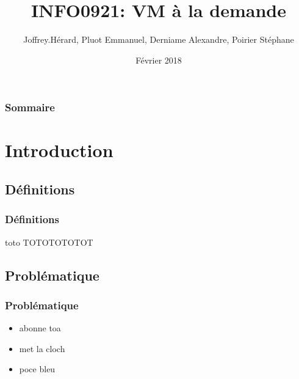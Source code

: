 \documentclass{beamer}
\title[Machines virtuelles à la demande]{INFO0921: VM à la demande } %
\author{Joffrey.Hérard, Pluot Emmanuel, Derniame Alexandre, Poirier Stéphane} %
\institute[URCA] %
{
Université de Reims \\ %
\medskip
\textit{joffrey.herard@etudiant.univ-reims.fr\\
		emmanuel.pluot@etudiant.univ-reims.fr\\
		alexandre.derniame@etudiant.univ-reims.fr\\
		stephane.poirier@etudiant.univ-reims.fr} 
}
\date{Février 2018} %
\begin{document}
\begin{frame}
\titlepage %
\end{frame}

\begin{frame}
\frametitle{Sommaire} %
\tableofcontents %
\end{frame}


\section{Introduction} 

\subsection{Définitions} 
\begin{frame}
\frametitle{Définitions}
\begin{block}{toto}
TOTOTOTOTOT
\end{block}
\end{frame}

\subsection{Problématique} 
\begin{frame}
\frametitle{Problématique}
\begin{itemize}
\item abonne toa
\item met la cloch
\item poce bleu
\end{itemize}
\end{frame}



\end{document}
